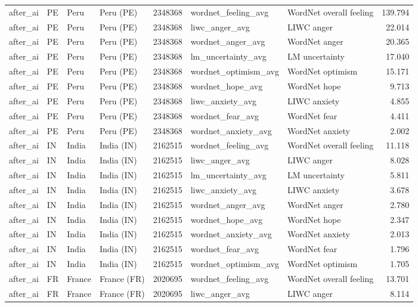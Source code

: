 \begin{tabular}{llllrllr}
after\_ai & PE & Peru & Peru (PE) & 2348368 & wordnet\_feeling\_avg & WordNet overall feeling & 139.794 \\
after\_ai & PE & Peru & Peru (PE) & 2348368 & liwc\_anger\_avg & LIWC anger & 22.014 \\
after\_ai & PE & Peru & Peru (PE) & 2348368 & wordnet\_anger\_avg & WordNet anger & 20.365 \\
after\_ai & PE & Peru & Peru (PE) & 2348368 & lm\_uncertainty\_avg & LM uncertainty & 17.040 \\
after\_ai & PE & Peru & Peru (PE) & 2348368 & wordnet\_optimism\_avg & WordNet optimism & 15.171 \\
after\_ai & PE & Peru & Peru (PE) & 2348368 & wordnet\_hope\_avg & WordNet hope & 9.713 \\
after\_ai & PE & Peru & Peru (PE) & 2348368 & liwc\_anxiety\_avg & LIWC anxiety & 4.855 \\
after\_ai & PE & Peru & Peru (PE) & 2348368 & wordnet\_fear\_avg & WordNet fear & 4.411 \\
after\_ai & PE & Peru & Peru (PE) & 2348368 & wordnet\_anxiety\_avg & WordNet anxiety & 2.002 \\
after\_ai & IN & India & India (IN) & 2162515 & wordnet\_feeling\_avg & WordNet overall feeling & 11.118 \\
after\_ai & IN & India & India (IN) & 2162515 & liwc\_anger\_avg & LIWC anger & 8.028 \\
after\_ai & IN & India & India (IN) & 2162515 & lm\_uncertainty\_avg & LM uncertainty & 5.811 \\
after\_ai & IN & India & India (IN) & 2162515 & liwc\_anxiety\_avg & LIWC anxiety & 3.678 \\
after\_ai & IN & India & India (IN) & 2162515 & wordnet\_anger\_avg & WordNet anger & 2.780 \\
after\_ai & IN & India & India (IN) & 2162515 & wordnet\_hope\_avg & WordNet hope & 2.347 \\
after\_ai & IN & India & India (IN) & 2162515 & wordnet\_anxiety\_avg & WordNet anxiety & 2.013 \\
after\_ai & IN & India & India (IN) & 2162515 & wordnet\_fear\_avg & WordNet fear & 1.796 \\
after\_ai & IN & India & India (IN) & 2162515 & wordnet\_optimism\_avg & WordNet optimism & 1.705 \\
after\_ai & FR & France & France (FR) & 2020695 & wordnet\_feeling\_avg & WordNet overall feeling & 13.701 \\
after\_ai & FR & France & France (FR) & 2020695 & liwc\_anger\_avg & LIWC anger & 8.114 \\

\end{tabular}
